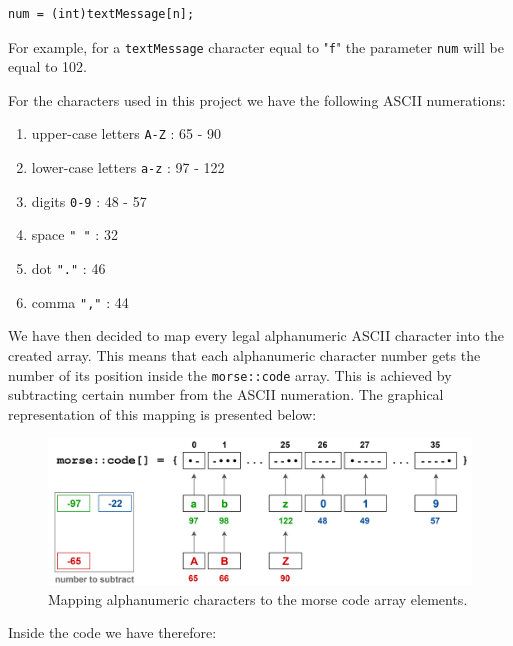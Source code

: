 \documentclass[12pt]{report}
\begin{document}
\begin{lstlisting}
num = (int)textMessage[n];
\end{lstlisting}

For example, for a \verb|textMessage| character equal to "\verb|f|" the parameter \verb|num| will be equal to 102.

For the characters used in this project we have the following ASCII numerations:


\begin{enumerate}

\item upper-case letters \verb|A-Z| : 65 - 90

\item lower-case letters \verb|a-z| : 97 - 122

\item digits \verb|0-9| : 48 - 57

\item space \verb|" "| : 32

\item dot \verb|"."| : 46

\item comma \verb|","| : 44

\end{enumerate}


We have then decided to map every legal alphanumeric ASCII character into the created array. This means that each alphanumeric character number gets the number of its position inside the \verb|morse::code| array. This is achieved by subtracting certain number from the ASCII numeration. The graphical representation of this mapping is presented below:

\begin{figure}[H]
\centering\includegraphics[scale=0.1]{morse_code_map}
\caption{Mapping alphanumeric characters to the morse code array elements.}				
\label{fig:morse_code_map}
\end{figure}

Inside the code we have therefore:
\end{document}
